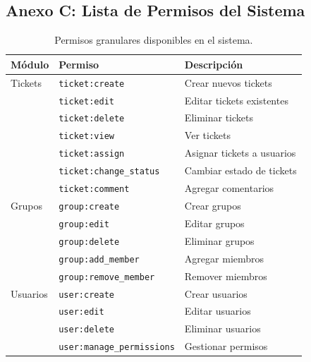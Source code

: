\documentclass[12pt,a4paper]{article}
\begin{document}
\subsection{Anexo C: Lista de Permisos del Sistema}

\begin{table}[H]
    \centering
    \caption{Permisos granulares disponibles en el sistema.}
    \label{tab:permisos}
    \begin{tabular}{@{}lll@{}}
        \toprule
        \textbf{Módulo} & \textbf{Permiso} & \textbf{Descripción} \\
        \midrule
        Tickets & \texttt{ticket:create} & Crear nuevos tickets \\
        & \texttt{ticket:edit} & Editar tickets existentes \\
        & \texttt{ticket:delete} & Eliminar tickets \\
        & \texttt{ticket:view} & Ver tickets \\
        & \texttt{ticket:assign} & Asignar tickets a usuarios \\
        & \texttt{ticket:change\_status} & Cambiar estado de tickets \\
        & \texttt{ticket:comment} & Agregar comentarios \\
        \midrule
        Grupos & \texttt{group:create} & Crear grupos \\
        & \texttt{group:edit} & Editar grupos \\
        & \texttt{group:delete} & Eliminar grupos \\
        & \texttt{group:add\_member} & Agregar miembros \\
        & \texttt{group:remove\_member} & Remover miembros \\
        \midrule
        Usuarios & \texttt{user:create} & Crear usuarios \\
        & \texttt{user:edit} & Editar usuarios \\
        & \texttt{user:delete} & Eliminar usuarios \\
        & \texttt{user:manage\_permissions} & Gestionar permisos \\
        \bottomrule
    \end{tabular}
\end{table}
\end{document}
